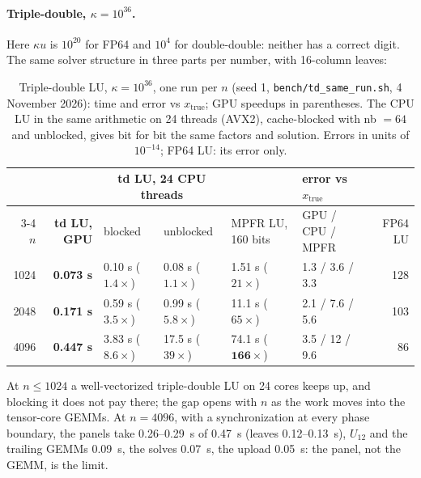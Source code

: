 \documentclass[11pt]{article}
\begin{document}
\paragraph{Triple-double, $\kappa=10^{36}$.} Here $\kappa u$ is $10^{20}$ for FP64 and $10^4$ for double-double: neither has a
correct digit. The same solver structure in three parts per number, with 16-column leaves:

\begin{table}[h]\centering
\caption{Triple-double LU, $\kappa=10^{36}$, one run per $n$ (seed 1, \texttt{bench/td\_same\_run.sh}, 4 November 2026): time
and error vs $x_{\mathrm{true}}$; GPU speedups in parentheses. The CPU LU in the same arithmetic on 24 threads (AVX2),
cache-blocked with nb $=64$ and unblocked, gives bit for bit the same factors and solution. Errors in units of $10^{-14}$;
FP64 LU: its error only.}\label{tab:td}
\footnotesize\setlength{\tabcolsep}{3.5pt}
\begin{tabular}{rrllllr}\toprule
& & \multicolumn{2}{c}{td LU, 24 CPU threads} & & error vs $x_{\mathrm{true}}$ & \\\cmidrule(lr){3-4}
$n$ & \textbf{td LU, GPU} & blocked & unblocked & MPFR LU, 160 bits & GPU / CPU / MPFR & FP64 LU \\\midrule
1024 & \textbf{0.073 s} & 0.10 s ($1.4\times$) & 0.08 s ($1.1\times$) & 1.51 s ($21\times$) & 1.3 / 3.6 / 3.3 & 128 \\
2048 & \textbf{0.171 s} & 0.59 s ($3.5\times$) & 0.99 s ($5.8\times$) & 11.1 s ($65\times$) & 2.1 / 7.6 / 5.6 & 103 \\
4096 & \textbf{0.447 s} & 3.83 s ($\mathbf{8.6\times}$) & 17.5 s ($39\times$) & 74.1 s ($\mathbf{166\times}$) & 3.5 / 12 / 9.6 & 86 \\\bottomrule
\end{tabular}
\end{table}
At $n\le1024$ a well-vectorized triple-double LU on 24 cores keeps up, and blocking it does not pay there; the gap opens with
$n$ as the work moves into the tensor-core GEMMs. At $n=4096$, with a synchronization at every phase boundary, the panels take
0.26--0.29~s of 0.47~s (leaves 0.12--0.13~s), $U_{12}$ and the trailing GEMMs 0.09~s, the solves 0.07~s, the upload 0.05~s: the
panel, not the GEMM, is the limit.
\end{document}
